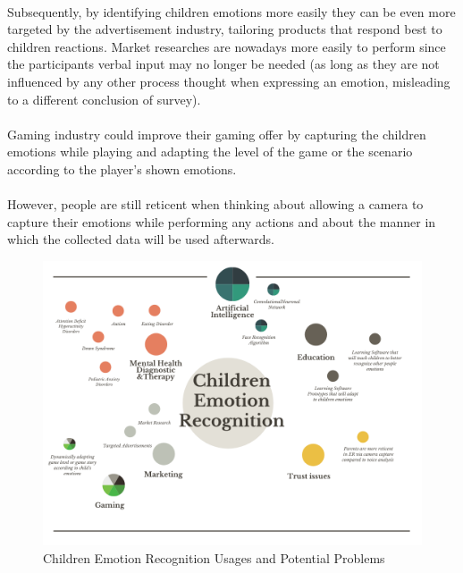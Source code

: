 \documentclass[runningheads,a4paper,11pt]{report}
\begin{document}
\paragraph{}
Subsequently, by identifying children emotions more easily they can be even more targeted by the advertisement industry, tailoring products that respond best to children reactions.
Market researches are nowadays more easily to perform since the participants verbal input may no longer be needed (as long as they are not influenced by any other process thought when expressing an emotion, misleading to a different conclusion of survey).

\paragraph{}
Gaming industry could improve their gaming offer by capturing the children emotions while playing and adapting the level of the game or the scenario according to the player's shown emotions.

\paragraph{}
However, people are still reticent when thinking about allowing a camera to capture their emotions while performing any actions and about the manner in which the collected data will be used afterwards.

\begin{figure}[!ht]
  \label{fig::MindMap}
  \centering
  \includegraphics[scale=0.6]{MindMap.png}
  \caption{Children Emotion Recognition Usages and Potential Problems}
\end{figure}
  
\end{document}
